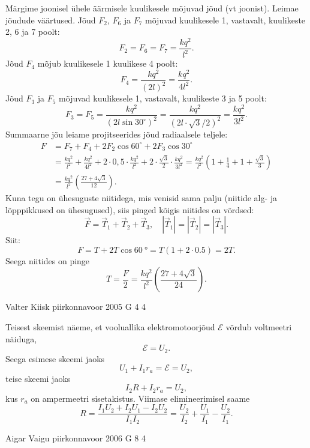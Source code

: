 \documentclass[11pt]{article}
\begin{document}
{{Märgime joonisel ühele äärmisele kuulikesele mõjuvad jõud (vt joonist). Leimae jõudude väärtused. Jõud $F_2$, $F_6$ ja $F_7$ mõjuvad kuulikesele 1, vastavalt, kuulikeste 2, 6 ja 7 poolt:
\[
F_2 = F_6 = F_7 = \frac{kq^2}{l^2}.
\]
Jõud $F_4$ mõjub kuulikesele 1 kuulikese 4 poolt:
\[
F_{4}=\frac{k q^{2}}{(2 l)^{2}}=\frac{k q^{2}}{4 l^{2}}.
\]
Jõud $F_3$ ja $F_5$ mõjuvad kuulikesele 1, vastavalt, kuulikeste 3 ja 5 poolt:
\[
F_{3}=F_{5}=\frac{k q^{2}}{\left(2 l \sin 30^{\circ}\right)^{2}}=\frac{k q^{2}}{(2 l \cdot \sqrt{3} / 2)^{2}}=\frac{k q^{2}}{3 l^{2}}.
\]
Summaarne jõu leiame projitseerides jõud radiaalsele teljele:
\[
\begin{aligned}
F&=F_{7}+F_{4}+2 F_{2} \cos 60^{\circ}+2 F_{3} \cos 30^{\circ}\\
&=\frac{k q^{2}}{l^{2}}+\frac{k q^{2}}{4 l^{2}}+2 \cdot 0,5 \cdot \frac{k q^{2}}{l^{2}}+2 \cdot \frac{\sqrt{3}}{2} \cdot \frac{k q^{2}}{3 l^{2}}=\frac{k q^{2}}{l^{2}}\left(1+\frac{1}{4}+1+\frac{\sqrt{3}}{3}\right)\\
&=\frac{k q^{2}}{l^{2}}\left(\frac{27+4 \sqrt{3}}{12}\right).
\end{aligned}
\]
Kuna tegu on ühesuguste niitidega, mis venisid sama palju (niitide alg- ja lõpppikkused on ühesugused), siis pinged kõigis niitides on võrdsed: 
\[
\vec{F}=\vec{T}_{1}+\vec{T}_{2}+\vec{T}_{3}, \quad\left|\vec{T}_{1}\right|=\left|\vec{T}_{2}\right|=\left|\vec{T}_{3}\right|.
\]
Siit:
\[
F = T + 2T \cos \SI{60}{\degree} = T (\num{1} + \num{2} \cdot \num{0,5}) = 2T.
\]
Seega niitides on pinge
\[
T=\frac{F}{2}=\frac{k q^{2}}{l^{2}}\left(\frac{27+4 \sqrt{3}}{24}\right).
\]
\fi
}

{Valter Kiisk} %
{piirkonnavoor} %
{2005} %
{G 4} %
{4} %
{

\ifSolution
Teisest skeemist näeme, et vooluallika elektromotoorjõud $\mathcal E$ võrdub voltmeetri näiduga,
\[
\mathcal E = U_2.
\]
Seega esimese skeemi jaoks
\[
U_1 + I_1r_a = \mathcal E = U_2,
\]
teise skeemi jaoks
\[
I_2R + I_2r_a = U_2,
\]
kus $r_a$ on ampermeetri sisetakistus. Viimase elimineerimisel saame
\[
R=\frac{I_{1} U_{2}+I_{2} U_{1}-I_{2} U_{2}}{I_{1} I_{2}}=\frac{U_{2}}{I_{2}}+\frac{U_{1}}{I_{1}}-\frac{U_{2}}{I_{1}}.
\]
\fi
}

{Aigar Vaigu} %
{piirkonnavoor} %
{2006} %
{G 8} %
{4} %
{

}}
\end{document}
